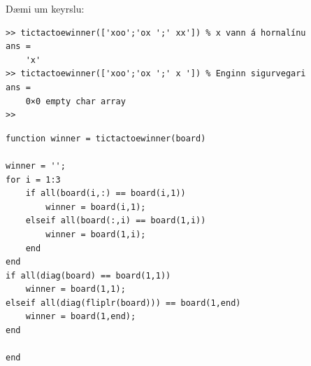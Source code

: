 \documentclass[addpoints]{exam}
\begin{document}
\begin{questions}
Dæmi um keyrslu:

\begin{verbatim}
>> tictactoewinner(['xoo';'ox ';' xx']) % x vann á hornalínu
ans =
    'x'
>> tictactoewinner(['xoo';'ox ';' x ']) % Enginn sigurvegari
ans =
    0×0 empty char array
>> 
\end{verbatim}

\begin{solution}

\begin{verbatim}
function winner = tictactoewinner(board)

winner = '';
for i = 1:3
    if all(board(i,:) == board(i,1))
        winner = board(i,1);
    elseif all(board(:,i) == board(1,i))
        winner = board(1,i);
    end
end
if all(diag(board) == board(1,1))
    winner = board(1,1);
elseif all(diag(fliplr(board))) == board(1,end)
    winner = board(1,end);
end

end
\end{verbatim}
    
\end{solution}

\end{questions}
\end{document}
